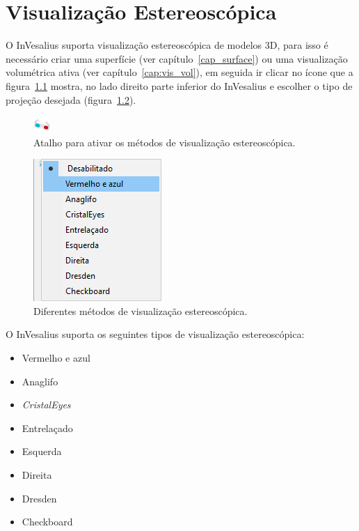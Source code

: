 \chapter{Visualização Estereoscópica}

O InVesalius suporta visualização estereoscópica de modelos 3D, para isso é necessário criar uma superfície (ver capítulo~\ref{cap_surface}) ou uma visualização volumétrica ativa (ver capítulo~\ref{cap:vis_vol}), em seguida ir clicar no ícone que a figura~\ref{fig:ster} mostra, no lado direito parte inferior do InVesalius e escolher o tipo de projeção desejada (figura~\ref{fig:st_menu}). 

\begin{figure}[!htb]
\centering
\includegraphics[scale=0.6]{../user_guide_figures/icons/3D_glasses.png}
\caption{Atalho para ativar os métodos de visualização estereoscópica.}
\label{fig:ster}
\end{figure}

\begin{figure}[!htb]
\centering
\includegraphics[scale=0.4]{../user_guide_figures/invesalius_screen/st_menu.png}
\caption{Diferentes métodos de visualização estereoscópica.}
\label{fig:st_menu}
\end{figure}

O InVesalius suporta os seguintes tipos de visualização estereoscópica:

\begin{itemize}
	\item Vermelho e azul
	\item Anaglifo
	\item \textit{CristalEyes}
	\item Entrelaçado
	\item Esquerda
	\item Direita
	\item Dresden
	\item Checkboard
\end{itemize}

